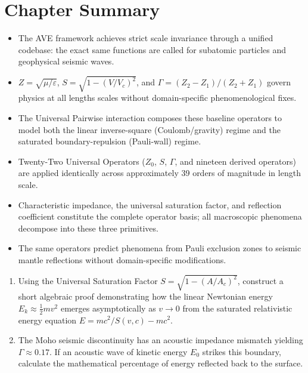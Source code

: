 \section*{Chapter Summary}
\begin{itemize}
    \item The AVE framework achieves strict scale invariance through a unified codebase: the exact same functions are called for subatomic particles and geophysical seismic waves.
    \item $Z = \sqrt{\mu/\varepsilon}$, $S = \sqrt{1 - (V/V_c)^2}$, and $\Gamma = (Z_2-Z_1)/(Z_2+Z_1)$ govern physics at all lengths scales without domain-specific phenomenological fixes.
    \item The Universal Pairwise interaction composes these baseline operators to model both the linear inverse-square (Coulomb/gravity) regime and the saturated boundary-repulsion (Pauli-wall) regime.
\end{itemize}

\begin{summarybox}
\begin{itemize}
    \item Twenty-Two Universal Operators ($Z_0$, $S$, $\Gamma$, and nineteen derived operators) are applied identically across approximately 39 orders of magnitude in length scale.
    \item Characteristic impedance, the universal saturation factor, and reflection coefficient constitute the complete operator basis; all macroscopic phenomena decompose into these three primitives.
    \item The same operators predict phenomena from Pauli exclusion zones to seismic mantle reflections without domain-specific modifications.
\end{itemize}
\end{summarybox}

\begin{exercisebox}
\begin{enumerate}
    \item Using the Universal Saturation Factor $S = \sqrt{1 - (A/A_c)^2}$, construct a short algebraic proof demonstrating how the linear Newtonian energy $E_k \approx \frac{1}{2}mv^2$ emerges asymptotically as $v \to 0$ from the saturated relativistic energy equation $E = mc^2/S(v, c) - mc^2$.
    \item The Moho seismic discontinuity has an acoustic impedance mismatch yielding $\Gamma \approx 0.17$. If an acoustic wave of kinetic energy $E_0$ strikes this boundary, calculate the mathematical percentage of energy reflected back to the surface.
\end{enumerate}
\end{exercisebox}

